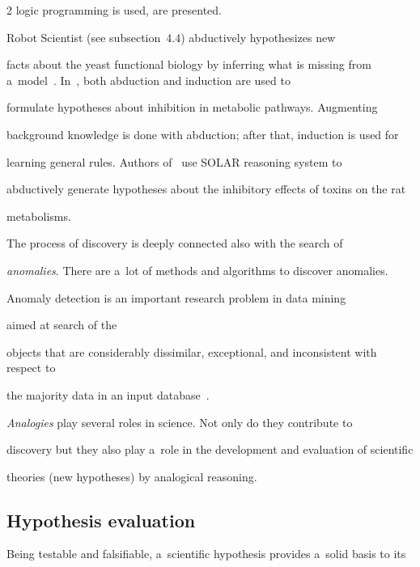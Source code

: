 \begin{multicols}{2}
logic programming is used, are presented.


Robot Scientist (see subsection~4.4) abductively hypothesizes new


facts about the yeast functional biology by inferring what is missing from a~model~\cite{23-kl}. In~\cite{24-kl}, both abduction and induction are used to


formulate hypotheses about inhibition in metabolic pathways. Augmenting


background knowledge is done with abduction; after that, induction is used for


learning general rules.  Authors of~\cite{25-kl} use SOLAR reasoning system to


abductively generate hypotheses about the inhibitory effects of toxins on the rat


metabolisms.





  The process of discovery is deeply connected also with the search of


\textit{anomalies}. There are a~lot of methods and algorithms to discover anomalies.


Anomaly detection is an important research problem in data mining


aimed at search of the


objects that are considerably dissimilar, exceptional, and inconsistent with respect to


the majority data in an input database~\cite{26-kl}.





  \textit{Analogies} play several roles in science. Not only do they contribute to


discovery but they also play a~role in the development and evaluation of scientific


theories (new hypotheses) by analogical reasoning.





\subsection{Hypothesis evaluation}





  \noindent


  Being testable and falsifiable, a~scientific hypothesis provides a~solid basis to its



\end{multicols}
